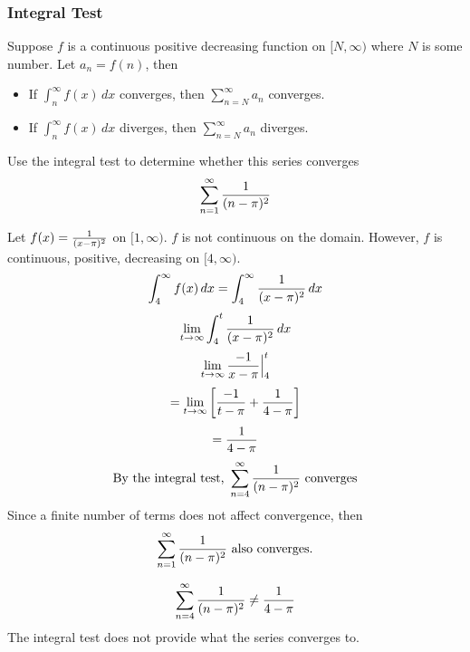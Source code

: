 \documentclass[english, 12pt]{article}
\begin{document}
\subsubsection{Integral Test}
Suppose $f$ is a continuous positive decreasing function on $[N,\infty)$ where $N$ is some number. Let $a_{n} = f(n)$, then
\begin{itemize}
\item If $\int_n^\infty f(x)\,dx$ converges, then $\sum_{n=N}^\infty a_{n}$ converges.
\item If $\int_n^\infty f(x)\,dx$ diverges, then $\sum_{n=N}^\infty a_{n}$ diverges.
\end{itemize}
\begin{exmp}
Use the integral test to determine whether this series converges
\[\sum_{n=1}^\infty \frac{1}{(n-\pi)^2} \]
\begin{sol}
Let $f(x) = \frac{1}{(x-\pi)^2}$ on $[1,\infty)$. $f$ is not continuous on the domain. However, $f$ is continuous, positive, decreasing on $[4,\infty)$.
\[ \int_4^\infty f(x)\,dx = \int_4^\infty \frac{1}{(x-\pi)^2}\, dx\]
\[ \lim_{t \to\infty} \int_4^t \frac{1}{(x-\pi)^2}\, dx \]
\[ \lim_{t \to\infty} \frac{-1}{x-\pi}\Big|_4^t \]
\[ = \lim_{t\to\infty} \left\lbrack\frac{-1}{t-\pi} + \frac{1}{4-\pi}\right\rbrack \]
\[ = \frac{1}{4-\pi} \]
\[\text{By the integral test, }\sum_{n=4}^\infty \frac{1}{(n-\pi)^2} \text{ converges}\]
Since a finite number of terms does not affect convergence, then 
\[\sum_{n=1}^\infty \frac{1}{(n-\pi)^2}\text{ also converges.} \]
\end{sol}
\end{exmp}
\begin{note}
\[\sum_{n=4}^\infty \frac{1}{(n-\pi)^2} \neq \frac{1}{4-\pi} \]
The integral test does not provide what the series converges to.
\end{note}
\end{document}
